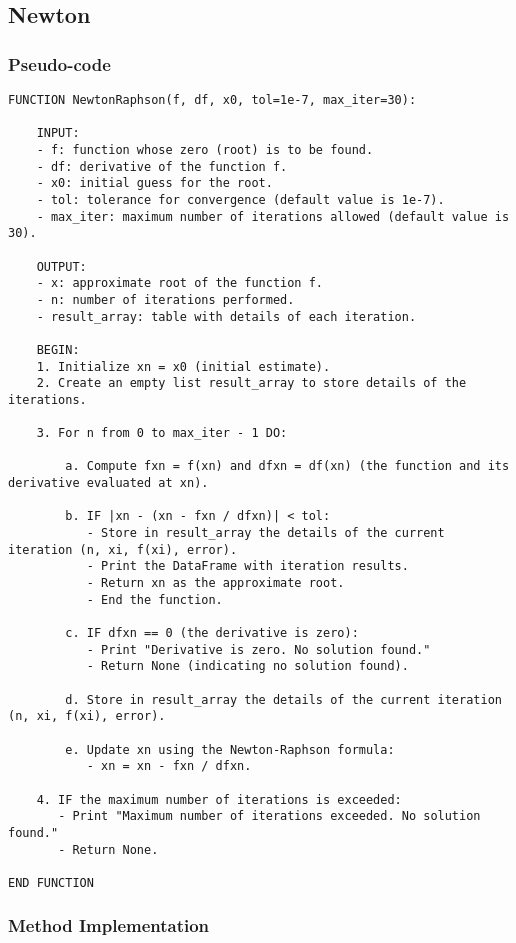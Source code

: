 \documentclass{article}
\begin{document}
    \subsection{Newton}
        \subsubsection{Pseudo-code}
\begin{lstlisting}
FUNCTION NewtonRaphson(f, df, x0, tol=1e-7, max_iter=30):

    INPUT:
    - f: function whose zero (root) is to be found.
    - df: derivative of the function f.
    - x0: initial guess for the root.
    - tol: tolerance for convergence (default value is 1e-7).
    - max_iter: maximum number of iterations allowed (default value is 30).

    OUTPUT:
    - x: approximate root of the function f.
    - n: number of iterations performed.
    - result_array: table with details of each iteration.

    BEGIN:
    1. Initialize xn = x0 (initial estimate).
    2. Create an empty list result_array to store details of the iterations.

    3. For n from 0 to max_iter - 1 DO:

        a. Compute fxn = f(xn) and dfxn = df(xn) (the function and its derivative evaluated at xn).

        b. IF |xn - (xn - fxn / dfxn)| < tol:
           - Store in result_array the details of the current iteration (n, xi, f(xi), error).
           - Print the DataFrame with iteration results.
           - Return xn as the approximate root.
           - End the function.

        c. IF dfxn == 0 (the derivative is zero):
           - Print "Derivative is zero. No solution found."
           - Return None (indicating no solution found).

        d. Store in result_array the details of the current iteration (n, xi, f(xi), error).

        e. Update xn using the Newton-Raphson formula:
           - xn = xn - fxn / dfxn.

    4. IF the maximum number of iterations is exceeded:
       - Print "Maximum number of iterations exceeded. No solution found."
       - Return None.

END FUNCTION
\end{lstlisting}

        \subsubsection{Method Implementation}
\end{document}
